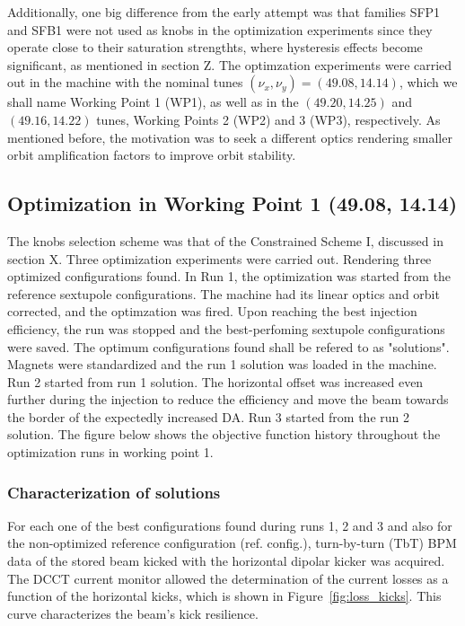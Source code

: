 Additionally, one big difference from the early attempt was that families SFP1 and SFB1 were not used as knobs in the optimization experiments since they operate close to their saturation strengthts, where hysteresis effects become significant, as mentioned in section Z. The optimzation experiments were carried out in the machine with the nominal tunes $(\nu_x,\nu_y)=(49.08, 14.14)$, which we shall name Working Point 1 (WP1), as well as in the $(49.20, 14.25)$ and $(49.16, 14.22)$ tunes, Working Points 2 (WP2) and 3 (WP3), respectively. As mentioned before, the motivation was to seek a different optics rendering smaller orbit amplification factors to improve orbit stability.
\subsection{Optimization in Working Point 1 (49.08, 14.14)}
The knobs selection scheme was that of the Constrained Scheme I, discussed in section X. Three optimization experiments were carried out. Rendering three optimized configurations found. In Run 1, the optimization was started from the reference sextupole configurations. The machine had its linear optics and orbit corrected, and the optimzation was fired. Upon reaching the best injection efficiency, the run was stopped and the best-perfoming sextupole configurations were saved. The optimum configurations found shall be refered to as "solutions". Magnets were standardized and the run 1 solution was loaded in the machine. Run 2  started from run 1 solution. The horizontal offset was increased even further during the injection to reduce the efficiency and move the beam towards the border of the expectedly increased DA. Run 3 started from the run 2 solution. The figure below shows the objective function history throughout the optimization runs in working point 1.
\subsubsection{Characterization of solutions}
For each one of the best configurations found during runs 1, 2 and 3 and also for the non-optimized reference configuration (ref. config.), turn-by-turn (TbT) BPM data of the stored beam kicked with the horizontal dipolar kicker was acquired. The DCCT current monitor allowed the determination of the current losses as a function of the horizontal kicks, which is shown in Figure~\ref{fig:loss_kicks}. This curve characterizes the beam's kick resilience.


